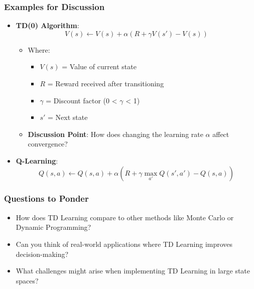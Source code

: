 \documentclass[aspectratio=169]{beamer}
\begin{document}
\begin{frame}[fragile]
    \frametitle{Examples for Discussion}
    \begin{itemize}
        \item \textbf{TD(0) Algorithm}:
            \begin{equation}
            V(s) \leftarrow V(s) + \alpha \left( R + \gamma V(s') - V(s) \right)
            \end{equation}
            \begin{itemize}
                \item Where:
                \begin{itemize}
                    \item $V(s)$ = Value of current state
                    \item $R$ = Reward received after transitioning
                    \item $\gamma$ = Discount factor (0 < $\gamma$ < 1)
                    \item $s'$ = Next state
                \end{itemize}
                \item \textbf{Discussion Point}: How does changing the learning rate $\alpha$ affect convergence?
            \end{itemize}
        
        \item \textbf{Q-Learning}:
            \begin{equation}
            Q(s, a) \leftarrow Q(s, a) + \alpha \left( R + \gamma \max_{a'} Q(s', a') - Q(s, a) \right)
            \end{equation}
    \end{itemize}
\end{frame}

\begin{frame}[fragile]
    \frametitle{Questions to Ponder}
    \begin{itemize}
        \item How does TD Learning compare to other methods like Monte Carlo or Dynamic Programming?
        \item Can you think of real-world applications where TD Learning improves decision-making?
        \item What challenges might arise when implementing TD Learning in large state spaces?
    \end{itemize}
\end{frame}
\end{document}

